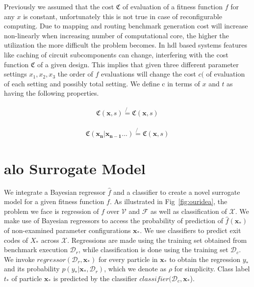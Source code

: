 \documentclass[10pt,conference,a4paper]{IEEEtran}
\begin{document}
Previously we assumed that the cost $\mathfrak{C}$ of evaluation of a fitness function $f$ for any $x$ is constant, unfortunately this is not true in case of reconfigurable computing.  Due to mapping and routing benchmark generation cost will increase non-linearly when increasing number of computational core, the higher the utilization the more difficult the problem becomes. In \ac{hdl} based systems features like caching of circuit subcomponents can change, interfering with the cost function $\mathfrak{C}$ of a given design. This implies that given three different parameter settings $x_1,x_2,x_3$ the order of $f$ evaluations will change the cost $c($ of evaluation of each setting and possibly total setting. We define c in terms of $x$ and $t$ as having the following properties.  


\begin{align} 
\mathfrak{C}(\mathbf{x},s) \not{=} \mathfrak{C}(\mathbf{x},s) 
\end{align}

\begin{align} 
\mathfrak{C}(\mathbf{x_n}|\mathbf{x_{n-1}}...) \not{=} \mathfrak{C}(\mathbf{x},s) 
\end{align}

\section{\ac{alo} Surrogate Model}
\label{surrogatemodels}

%
We integrate a Bayesian regressor $\hat{f}$ and a classifier to create a novel surrogate model for a given fitness function $f$. As illustrated in Fig~\ref{fig:ouridea}, the problem we face is regression of $f$ over $\mathcal{V}$ and $\mathcal{F}$ as well as classification of $\mathcal{X}$. We make use of Bayesian regressors to access the probability of prediction of $\hat{f}(\mathbf{x_*})$ of non-examined parameter configurations $\mathbf{x_*}$. We use classifiers to predict exit codes of $X_*$ across $\mathcal{X}$. Regressions are made using the training set obtained from benchmark execution $\mathcal{D}_{r}$, while classification is done using the training set $\mathcal{D}_{c}$. We invoke $regressor(\mathcal{D}_{r},\mathbf{x_*})$ for every particle in $\mathbf{x_*}$ to obtain the regression $y_*$ and its probability $p(y_* | \mathbf{x_*},\mathcal{D}_{r})$, which we denote as $\rho$ for simplicity. Class label $t_*$ of particle $\mathbf{x_*}$ is predicted by the classifier $classifier(\mathcal{D}_{c},\mathbf{x_*}$). 
\end{document}
